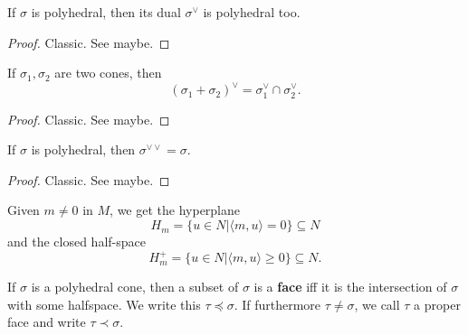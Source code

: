 \begin{proposition}
  \label{1-2-4-dual-polyhedral-cone}

  If $\sigma$ is polyhedral, then its dual $\sigma^\vee$ is polyhedral too.
\end{proposition}
\begin{proof}
  \uses{}

  Classic. See \cite{Oda_1988} maybe.
\end{proof}


\begin{proposition}
  \label{1-2-dual-cone-add}

  If $\sigma_1, \sigma_2$ are two cones, then
  $$(\sigma_1 + \sigma_2)^\vee = \sigma_1^\vee \cap \sigma_2^\vee.$$
\end{proposition}
\begin{proof}
  \uses{}

  Classic. See \cite{Oda_1988} maybe.
\end{proof}


\begin{proposition}
  \label{1-2-4-double-dual-polyhedral-cone}

  If $\sigma$ is polyhedral, then $\sigma^{\vee\vee} = \sigma$.
\end{proposition}
\begin{proof}
  \uses{}

  Classic. See \cite{Oda_1988} maybe.
\end{proof}


Given $m \ne 0$ in $M$, we get the hyperplane
$$H_m = \{u \in N | \langle m, u\rangle = 0\} \subseteq N$$
and the closed half-space
$$H_m^+ = \{u \in N | \langle m, u\rangle \ge 0\} \subseteq N.$$


\begin{definition}
  \label{1-2-5-face}
  \uses{}
  \leanok

  If $\sigma$ is a polyhedral cone, then a subset of $\sigma$ is a {\bf face} iff it is the intersection of $\sigma$ with some halfspace. We write this $\tau \preceq \sigma$. If furthermore $\tau \ne \sigma$, we call $\tau$ a proper face and write $\tau \prec \sigma$.
\end{definition}


